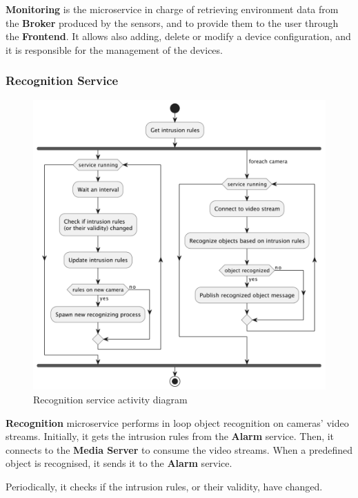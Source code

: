 \documentclass{scrartcl}
\begin{document}
    \textbf{Monitoring} is the microservice in charge of retrieving environment data from the \textbf{Broker} produced by the sensors,
    and to provide them to the user through the \textbf{Frontend}.
    It allows also adding, delete or modify a device configuration, and it is responsible for the management of the devices.

    \subsubsection{Recognition Service}
    \begin{figure}
        \centering
        \includegraphics[scale=0.6]{img/recognition-activity}
        \caption{Recognition service activity diagram}
        \label{fig:recognition-activity}
    \end{figure}

    \textbf{Recognition} microservice performs in loop object recognition on cameras' video streams.
    Initially, it gets the intrusion rules from the \textbf{Alarm} service.
    Then, it connects to the \textbf{Media Server} to consume the video streams.
    When a predefined object is recognised, it sends it to the \textbf{Alarm} service.

    Periodically, it checks if the intrusion rules, or their validity, have changed.
\end{document}
